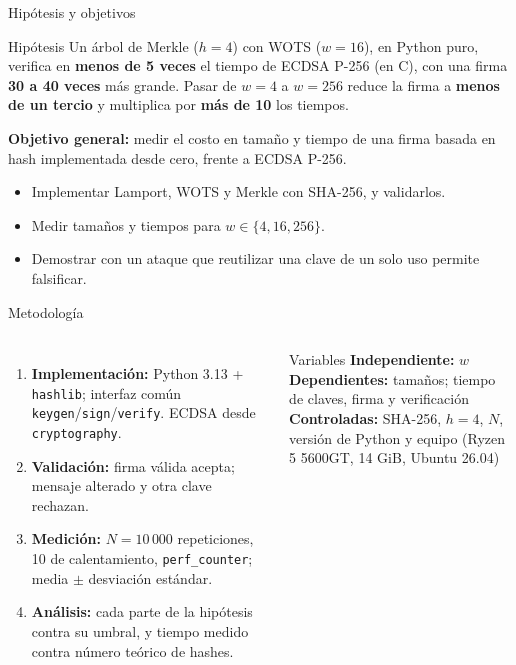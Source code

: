 \documentclass[aspectratio=169,11pt]{beamer}
\begin{document}
\begin{frame}{Hipótesis y objetivos}
  \begin{block}{Hipótesis}
    Un árbol de Merkle ($h=4$) con WOTS ($w=16$), en Python puro, verifica en
    \textbf{menos de 5 veces} el tiempo de ECDSA P-256 (en C), con una firma
    \textbf{30 a 40 veces} más grande. Pasar de $w=4$ a $w=256$ reduce la firma a
    \textbf{menos de un tercio} y multiplica por \textbf{más de 10} los tiempos.
  \end{block}
  \textbf{Objetivo general:} medir el costo en tamaño y tiempo de una firma basada en hash
  implementada desde cero, frente a ECDSA P-256.
  \begin{itemize}
    \item Implementar Lamport, WOTS y Merkle con SHA-256, y validarlos.
    \item Medir tamaños y tiempos para $w\in\{4,16,256\}$.
    \item Demostrar con un ataque que reutilizar una clave de un solo uso permite falsificar.
  \end{itemize}
\end{frame}

\begin{frame}{Metodología}
  \begin{columns}[T]
    \begin{enumerate}
      \item \textbf{Implementación:} Python 3.13 + \texttt{hashlib}; interfaz común
            \texttt{keygen}/\texttt{sign}/\texttt{verify}. ECDSA desde \texttt{cryptography}.
      \item \textbf{Validación:} firma válida acepta; mensaje alterado y otra clave rechazan.
      \item \textbf{Medición:} $N = 10\,000$ repeticiones, 10 de calentamiento,
            \texttt{perf\_counter}; media $\pm$ desviación estándar.
      \item \textbf{Análisis:} cada parte de la hipótesis contra su umbral, y tiempo medido contra
            número teórico de hashes.
    \end{enumerate}
    \begin{block}{Variables}
      \small
      \textbf{Independiente:} $w$\\
      \textbf{Dependientes:} tamaños; tiempo de claves, firma y verificación\\
      \textbf{Controladas:} SHA-256, $h=4$, $N$, versión de Python y equipo
      (Ryzen 5 5600GT, 14 GiB, Ubuntu 26.04)
    \end{block}
  \end{columns}
\end{frame}
\end{document}
